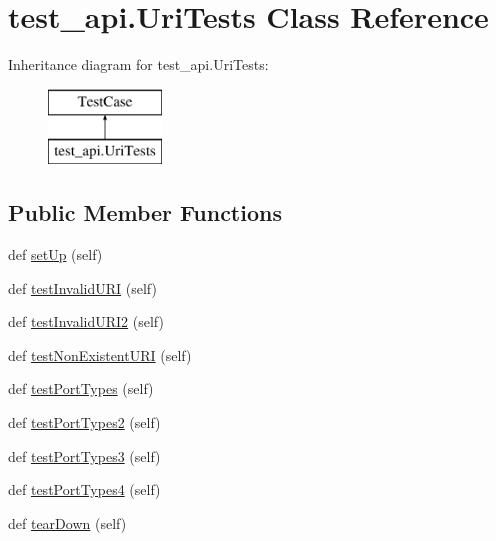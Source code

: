 \hypertarget{classtest__api_1_1_uri_tests}{}\section{test\+\_\+api.\+Uri\+Tests Class Reference}
\label{classtest__api_1_1_uri_tests}
Inheritance diagram for test\+\_\+api.\+Uri\+Tests\+:\begin{figure}[H]
\begin{center}
\leavevmode
\includegraphics[height=2.000000cm]{classtest__api_1_1_uri_tests}
\end{center}
\end{figure}
\subsection*{Public Member Functions}
\begin{DoxyCompactItemize}
\item 
def \hyperlink{classtest__api_1_1_uri_tests_a55b681a64efb3329255698a61f6bd9cd}{set\+Up} (self)
\item 
def \hyperlink{classtest__api_1_1_uri_tests_a17aa27c340e6c1e35f54b1ab462be7cb}{test\+Invalid\+U\+RI} (self)
\item 
def \hyperlink{classtest__api_1_1_uri_tests_a86c3e301fda31889c869558dbafbabcf}{test\+Invalid\+U\+R\+I2} (self)
\item 
def \hyperlink{classtest__api_1_1_uri_tests_a80a33a5f0e643e48cf9ad7b62b4a8c4d}{test\+Non\+Existent\+U\+RI} (self)
\item 
def \hyperlink{classtest__api_1_1_uri_tests_ad274c8f19d685b787b819797cf546536}{test\+Port\+Types} (self)
\item 
def \hyperlink{classtest__api_1_1_uri_tests_af5bc818f5e5eadfa93f1d7dc48c1bfe5}{test\+Port\+Types2} (self)
\item 
def \hyperlink{classtest__api_1_1_uri_tests_a368f81f50102e6fc82f7d26ba8cb9b83}{test\+Port\+Types3} (self)
\item 
def \hyperlink{classtest__api_1_1_uri_tests_ae122aaf551cd6b1ac20689efbafa097c}{test\+Port\+Types4} (self)
\item 
def \hyperlink{classtest__api_1_1_uri_tests_a53c4f33e4943a34dc80a912ce8b74be8}{tear\+Down} (self)
\end{DoxyCompactItemize}
